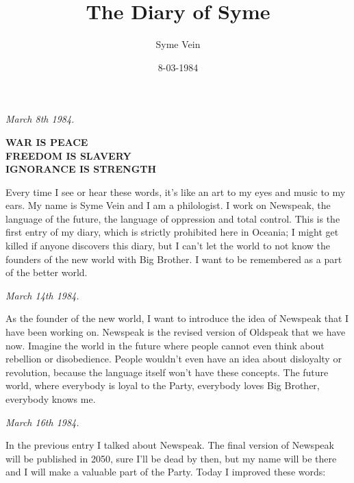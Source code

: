 \documentclass{article}
\title{The Diary of Syme}
\author{Syme Vein}
\date{8-03-1984}
\begin{document}
\maketitle
\newpage

\begin{flushleft}
  \textit{March 8th 1984.}
  \end{flushleft}

\begin{center}
  \textbf{WAR IS PEACE}\\
  \textbf{FREEDOM IS SLAVERY}\\
  \textbf{IGNORANCE IS STRENGTH}\\
\end{center}

Every time I see or hear these words, it’s like an art to my eyes and music to my ears. My name is Syme Vein and I am a philologist. I work on Newspeak, the language of the future, the language of oppression and total control. This is the first entry of my diary, which is strictly prohibited here in Oceania; I might get killed if anyone discovers this diary, but I can’t let the world to not know the founders of the new world with Big Brother. I want to be remembered as a part of the better world. \\


\begin{flushleft}
  \textit{March 14th 1984.}
  \end{flushleft}

As the founder of the new world, I want to introduce the idea of Newspeak that I have been working on. Newspeak is the revised version of Oldspeak that we have now. Imagine the world in the future where people cannot even think about rebellion or disobedience. People wouldn’t even have an idea about disloyalty or revolution, because the language itself won’t have these concepts. The future world, where everybody is loyal to the Party, everybody loves Big Brother, everybody knows me.
 \\ 

\begin{flushleft}
  \textit{March 16th 1984.}
  \end{flushleft}

In the previous entry I talked about Newspeak. The final version of Newspeak will be published in 2050, sure I'll be dead by then, but my name will be there and I will make a valuable part of the Party. Today I improved these words:\\
\end{document}
